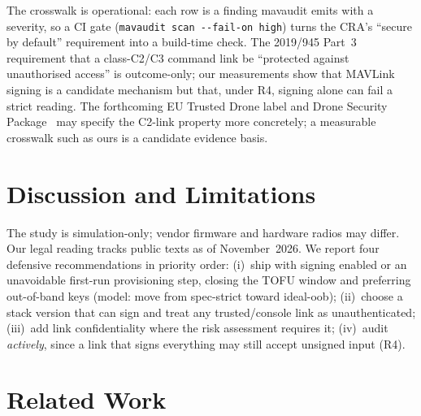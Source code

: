 \documentclass[conference]{IEEEtran}
\newcommand{\prop}[1]{\textsf{#1}}
\newcommand{\code}[1]{\texttt{#1}}
\begin{document}
The crosswalk is operational: each row is a finding mavaudit emits with a
severity, so a CI gate (\code{mavaudit scan \texttt{-{}-}fail-on high}) turns the
CRA's ``secure by default'' requirement into a build-time check. The 2019/945
Part~3 requirement that a class-C2/C3 command link be ``protected against
unauthorised access'' is outcome-only; our measurements show that MAVLink
signing is a candidate mechanism but that, under \prop{R4}, signing alone can
fail a strict reading. The forthcoming EU Trusted Drone label and Drone Security
Package~\cite{ec2026droneactionplan} may specify the C2-link property more
concretely; a measurable crosswalk such as ours is a candidate evidence basis.

\section{Discussion and Limitations}
\label{sec:discussion}

The study is simulation-only; vendor firmware and hardware radios may differ.
Our legal reading tracks public texts as of November~2026. We report four
defensive recommendations in priority order: (i)~ship with signing enabled or an
unavoidable first-run provisioning step, closing the TOFU window and preferring
out-of-band keys (model: move from \textsf{spec-strict} toward \textsf{ideal-oob});
(ii)~choose a stack version that can sign and treat any trusted/console link as
unauthenticated; (iii)~add link confidentiality where the risk assessment
requires it; (iv)~audit \emph{actively}, since a link that signs everything may
still accept unsigned input (\prop{R4}).

\section{Related Work}
\label{sec:related}
\end{document}
